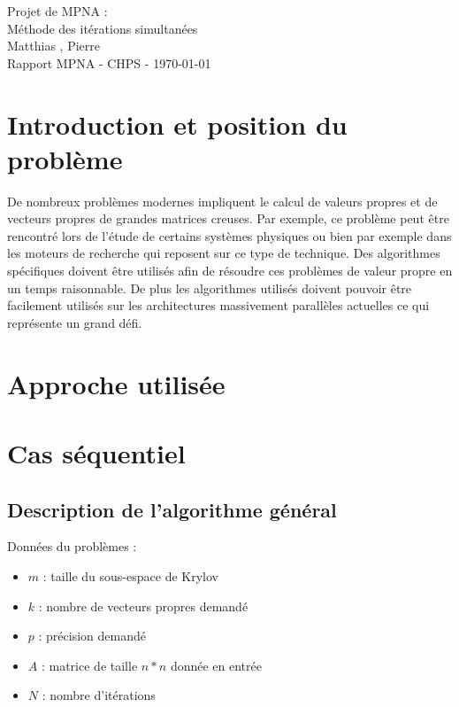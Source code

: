 \documentclass[11pt,a4paper]{article}
\begin{document}
\begin{center}

	{\LARGE\centering Projet de MPNA :\\ Méthode des itérations simultanées}\\[1cm]

	{ Matthias , Pierre }\\[0.5cm]
	{Rapport MPNA - CHPS - \today}\\[2cm]
\end{center}

\tableofcontents
\newpage

\section{Introduction et position du problème}
	De nombreux problèmes modernes impliquent le calcul de valeurs propres et de vecteurs propres de grandes matrices creuses. Par exemple, ce problème peut être rencontré lors de l'étude de certains systèmes physiques ou bien par exemple dans les moteurs de recherche qui reposent sur ce type de technique. Des algorithmes spécifiques doivent être utilisés afin de résoudre ces problèmes de valeur propre en un temps raisonnable. De plus les algorithmes utilisés doivent pouvoir être facilement utilisés sur les architectures massivement parallèles actuelles ce qui représente un grand défi.

\section{Approche utilisée}

\section{Cas séquentiel}

	\subsection{Description de l'algorithme général}

		Données du problèmes :

		\begin{itemize}
			\item $m$ : taille du sous-espace de Krylov
			\item $k$ : nombre de vecteurs propres demandé
			\item $p$ : précision demandé
			\item $A$ : matrice de taille $n*n$ donnée en entrée
			\item $N$ : nombre d'itérations
		\end{itemize}
\end{document}
